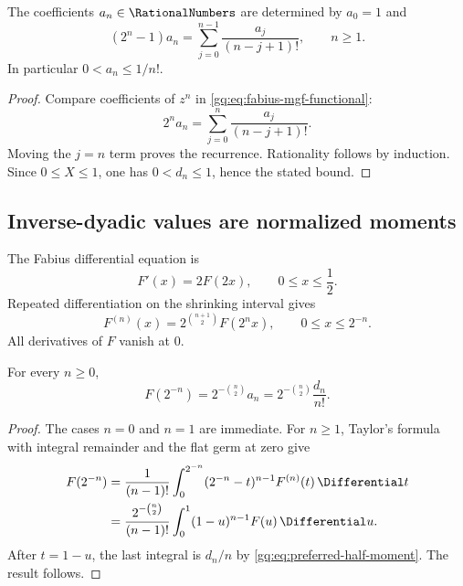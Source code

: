\begin{proposition}
\label{gq:prop:fabius-moment-recurrence}
The coefficients $a_n\in\RationalNumbers$ are determined by $a_0=1$ and
\begin{equation}
 \boxed{
 (2^n-1)a_n=\sum_{j=0}^{n-1}\frac{a_j}{(n-j+1)!},
 \qquad n\ge1.}
 \label{gq:eq:fabius-a-recurrence}
\end{equation}
In particular $0<a_n\le1/n!$.
\end{proposition}

\begin{proof}
Compare coefficients of $z^n$ in \eqref{gq:eq:fabius-mgf-functional}:
\[
 2^na_n=\sum_{j=0}^{n}\frac{a_j}{(n-j+1)!}.
\]
Moving the $j=n$ term proves the recurrence.  Rationality follows by
induction.  Since $0\le X\le1$, one has $0<d_n\le1$, hence the stated bound.
\end{proof}

\subsection{Inverse-dyadic values are normalized moments}

The Fabius differential equation is
\begin{equation}
 F'(x)=2F(2x),
 \qquad 0\le x\le\frac12.
 \label{gq:eq:fabius-differential}
\end{equation}
Repeated differentiation on the shrinking interval gives
\begin{equation}
 F^{(n)}(x)=2^{\binom{n+1}{2}}F(2^nx),
 \qquad 0\le x\le2^{-n}.
 \label{gq:eq:fabius-repeated-derivative}
\end{equation}
All derivatives of $F$ vanish at $0$.

\begin{theorem}
\label{gq:thm:fabius-inverse-dyadic}
For every $n\ge0$,
\begin{equation}
 \boxed{
 F(2^{-n})=2^{-\binom n2}a_n
          =2^{-\binom n2}\frac{d_n}{n!}.}
 \label{gq:eq:fabius-inverse-dyadic}
\end{equation}
\end{theorem}

\begin{proof}
The cases $n=0$ and $n=1$ are immediate.  For $n\ge1$, Taylor's formula
with integral remainder and the flat germ at zero give
\begin{align*}
 F(2^{-n})
 &=\frac1{(n-1)!}\int_0^{2^{-n}}
   (2^{-n}-t)^{n-1}F^{(n)}(t)\,\Differential t\\
 &=\frac{2^{-\binom n2}}{(n-1)!}
   \int_0^1(1-u)^{n-1}F(u)\,\Differential u.
\end{align*}
After $t=1-u$, the last integral is $d_n/n$ by
\eqref{gq:eq:preferred-half-moment}.  The result follows.
\end{proof}


